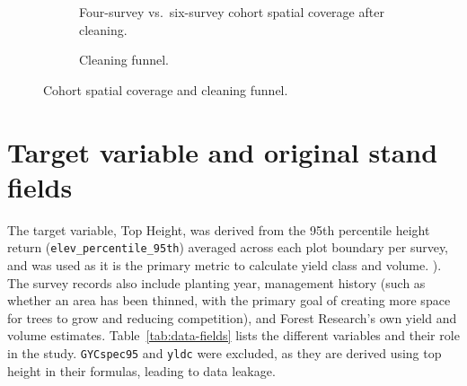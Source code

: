 \begin{figure} [!htbp]
\begin{subfigure}[t]{0.55\textwidth}
\centering
{}
\caption{Four-survey vs.\ six-survey cohort spatial coverage after cleaning.}
\label{fig:data-cohort-map}
\end{subfigure}%
\hfill
\begin{subfigure}[t]{0.4\textwidth}
\centering
{}
\caption{Cleaning funnel.}
\label{fig:data-cohort-table}
\end{subfigure}
\caption{Cohort spatial coverage and cleaning funnel.}
\label{fig:data-cohort-coverage}
\end{figure}

\section{Target variable and original stand fields}
\label{sec:data-response}

The target variable, Top Height, was derived from the 95th percentile height return (\texttt{elev\_percentile\_95th}) averaged across each plot boundary per survey, and was used as it is the primary metric to calculate yield class and volume. ). The survey records also include planting year, management history (such as whether an area has been thinned, with the primary goal of creating more space for trees to grow and reducing competition), and Forest Research's own yield and volume estimates. Table~\ref{tab:data-fields} lists the different variables and their role in the study. \texttt{GYCspec95} and \texttt{yldc} were excluded, as they are derived using top height in their formulas, leading to data leakage.

